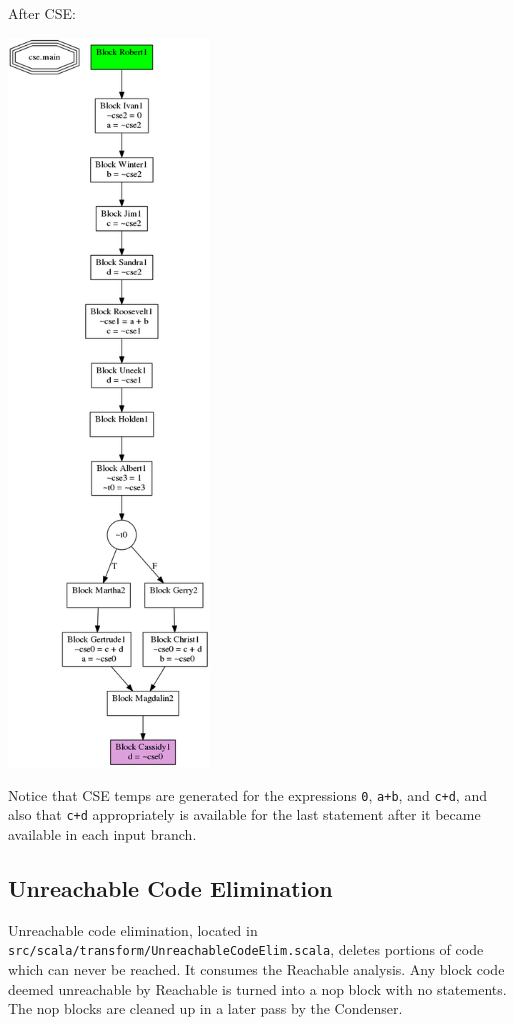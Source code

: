\documentclass[11pt]{article}
\begin{document}
  After CSE:

  \includegraphics[width=0.4\textwidth]{./after_cse.png}

  Notice that CSE temps are generated for the expressions \texttt{0}, \texttt{a+b}, and \texttt{c+d}, and also that \texttt{c+d}
  appropriately is available for the last statement after it became available in each input branch. 


\subsection{Unreachable Code Elimination}
\label{sec-2.3}

    Unreachable code elimination, located in \texttt{src/scala/transform/UnreachableCodeElim.scala}, 
    deletes portions of code which can never be reached. It consumes the Reachable analysis. Any 
    block code deemed unreachable by Reachable is turned into a nop block with no statements. The 
    nop blocks are cleaned up in a later pass by the Condenser.
\end{document}
